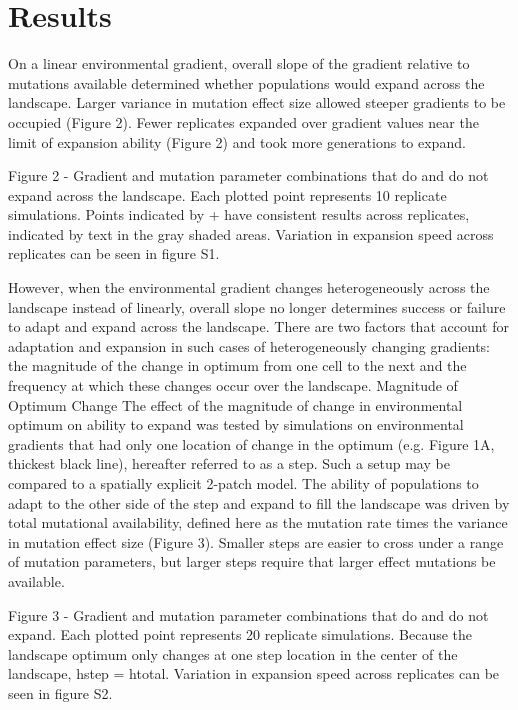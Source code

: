 \section{Results}

On a linear environmental gradient, overall slope of the gradient relative to mutations 
available determined whether populations would expand across the landscape. Larger variance 
in mutation effect size allowed steeper gradients to be occupied (Figure 2). Fewer replicates 
expanded over gradient values near the limit of expansion ability (Figure 2) and took more 
generations to expand.

Figure 2 - Gradient and mutation parameter combinations that do and do not expand across 
the landscape. Each plotted point represents 10 replicate simulations. Points indicated 
by + have consistent results across replicates, indicated by text in the gray shaded areas. 
Variation in expansion speed across replicates can be seen in figure S1.

However, when the environmental gradient changes heterogeneously across the landscape 
instead of linearly, overall slope no longer determines success or failure to adapt and 
expand across the landscape. There are two factors that account for adaptation and 
expansion in such cases of heterogeneously changing gradients: the magnitude of the 
change in optimum from one cell to the next and the frequency at which these changes 
occur over the landscape.
Magnitude of Optimum Change
	The effect of the magnitude of change in environmental optimum on ability to expand 
	was tested by simulations on environmental gradients that had only one location of 
	change in the optimum (e.g. Figure 1A, thickest black line), hereafter referred to 
	as a step. Such a setup may be compared to a spatially explicit 2-patch model. The 
	ability of populations to adapt to the other side of the step and expand to fill the 
	landscape was driven by total mutational availability, defined here as the mutation 
	rate times the variance in mutation effect size (Figure 3). Smaller steps are easier 
	to cross under a range of mutation parameters, but larger steps require that larger 
	effect mutations be available.

Figure 3 - Gradient and mutation parameter combinations that do and do not expand. Each 
plotted point represents 20 replicate simulations. Because the landscape optimum only 
changes at one step location in the center of the landscape, hstep = htotal. Variation 
in expansion speed across replicates can be seen in figure S2.

